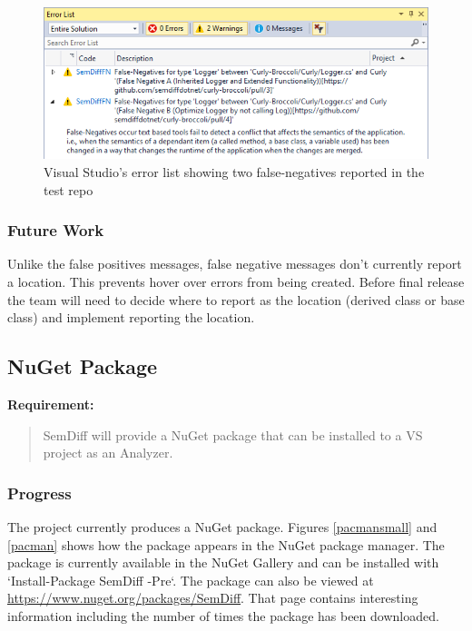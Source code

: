 \documentclass[draftclsnofoot,onecolumn]{IEEEtran}
\begin{document}
\begin{figure}[!t]
\centering
\includegraphics[width=\textwidth]{FalseNegativeErrorList}
\caption{Visual Studio’s error list showing two false-negatives reported in 
the test repo}
\label{fnerrorlist}
\end{figure}

\subsubsection{Future Work}

Unlike the false positives messages, false negative messages don’t currently 
report a location. This prevents hover over errors from being created. Before 
final release the team will need to decide where to report as the location 
(derived class or base class) and implement reporting the location.

\subsection{NuGet Package}%

\textbf{Requirement:}

\begin{quote}

SemDiff will provide a NuGet package that can be installed to a VS project as 
an Analyzer.

\end{quote}

\subsubsection{Progress}
The project currently produces a NuGet package. Figures \ref{pacmansmall} and 
\ref{pacman} shows how the package appears in the NuGet package manager. The 
package is currently available in the NuGet Gallery and can be installed with 
`Install-Package SemDiff -Pre`. The package can also be viewed at 
\url{https://www.nuget.org/packages/SemDiff}. That page contains interesting 
information including the number of times the package has been downloaded.
\end{document}
